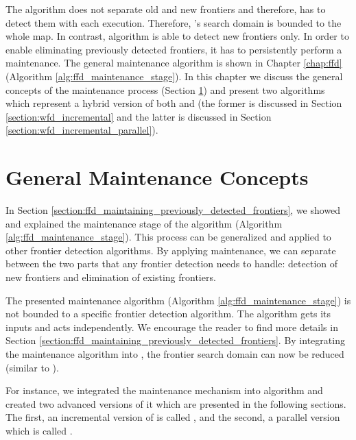 The \WFD algorithm does not separate old and new frontiers and 
therefore, has to detect them with each execution. Therefore, \WFD's search
domain is bounded to the whole map. In contrast, \FFD algorithm is able to detect new frontiers
only. In order to enable \FFD eliminating previously detected frontiers, it has
to persistently perform a maintenance. 
The general maintenance algorithm is shown in Chapter \ref{chap:ffd} (Algorithm
\ref{alg:ffd_maintenance_stage}). In this
chapter we discuss the general concepts of the maintenance process
(Section \ref{section:general_maintenenace_concepts}) and present two
algorithms which represent a hybrid version of both \WFD and \FFD (the
former is discussed in Section \ref{section:wfd_incremental} and the
latter is discussed in Section \ref{section:wfd_incremental_parallel}).

\section{General Maintenance Concepts}
\label{section:general_maintenenace_concepts}

In Section \ref{section:ffd_maintaining_previously_detected_frontiers}, we
showed and explained the maintenance stage of the \FFD algorithm (Algorithm
\ref{alg:ffd_maintenance_stage}). This process can be generalized
and applied to other frontier detection algorithms. By applying maintenance, we
can separate between the two parts that any frontier detection needs to handle:
detection of new frontiers and elimination of existing frontiers. 

The presented maintenance algorithm (Algorithm \ref{alg:ffd_maintenance_stage})
is not bounded to a specific frontier detection algorithm. The algorithm gets
its inputs and acts independently. We encourage the reader
to find more details in Section
\ref{section:ffd_maintaining_previously_detected_frontiers}.
By integrating the maintenance algorithm into \WFD, the frontier search domain
can now be reduced (similar to \FFD). 
%

For instance, we integrated the maintenance mechanism into \WFD
algorithm and created two advanced versions of it which are presented in the
following sections. The first, an incremental version of \WFD is called
\WFDINC, and the second, a parallel version which is called \WFDIP.

